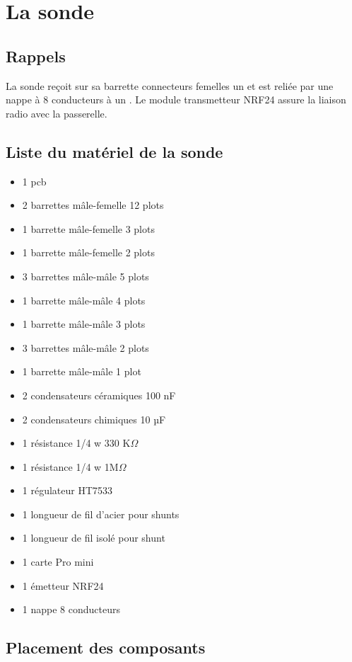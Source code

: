 
\chapter{La sonde}


\section{Rappels}


La sonde reçoit sur sa barrette connecteurs femelles un  et est reliée par une nappe à 8 conducteurs à un .
Le module transmetteur NRF24 assure la liaison radio avec la passerelle. 

\section{Liste du matériel de la sonde}

\begin{itemize}
\item 1 pcb
\item 2 barrettes mâle-femelle 12 plots		
\item 1 barrette mâle-femelle 3 plots	
\item 1 barrette mâle-femelle 2 plots	
\item 3 barrettes mâle-mâle 5 plots		
\item 1 barrette mâle-mâle 4 plots		
\item 1 barrette mâle-mâle 3 plots		
\item 3 barrettes mâle-mâle 2 plots		
\item 1 barrette mâle-mâle 1 plot		
\item 2 condensateurs céramiques 100 nF
\item 2 condensateurs chimiques    10 µF
\item 1 résistance 1/4 w  330 K$\Omega$
\item 1 résistance 1/4 w 1M$\Omega$
\item 1 régulateur HT7533
\item 1 longueur de fil d'acier pour shunts
\item 1 longueur de fil isolé pour shunt
\item 1 carte Pro mini
\item 1 émetteur NRF24
\item 1 nappe 8 conducteurs
\end{itemize}

\section{Placement des composants}

